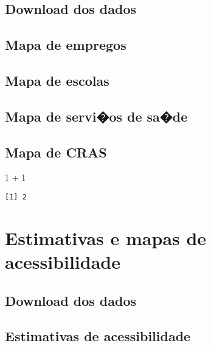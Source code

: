 \documentclass[
  letterpaper,
  DIV=11,
  numbers=noendperiod]{scrreprt}
\newenvironment{Shaded}{\begin{snugshade}}{\end{snugshade}}
\newcommand{\DecValTok}[1]{\textcolor[rgb]{0.68,0.00,0.00}{#1}}
\newcommand{\SpecialCharTok}[1]{\textcolor[rgb]{0.37,0.37,0.37}{#1}}
\begin{document}
\hypertarget{download-dos-dados-1}{%
\section{Download dos dados}\label{download-dos-dados-1}}

\hypertarget{mapa-de-empregos}{%
\section{Mapa de empregos}\label{mapa-de-empregos}}

\hypertarget{mapa-de-escolas}{%
\section{Mapa de escolas}\label{mapa-de-escolas}}

\hypertarget{mapa-de-servios-de-sade}{%
\section{Mapa de servi�os de sa�de}\label{mapa-de-servios-de-sade}}

\hypertarget{mapa-de-cras}{%
\section{Mapa de CRAS}\label{mapa-de-cras}}

\begin{Shaded}
\begin{Highlighting}[]
\DecValTok{1} \SpecialCharTok{+} \DecValTok{1}
\end{Highlighting}
\end{Shaded}

\begin{verbatim}
[1] 2
\end{verbatim}

\hypertarget{estimativas-e-mapas-de-acessibilidade}{%
\chapter{Estimativas e mapas de
acessibilidade}\label{estimativas-e-mapas-de-acessibilidade}}

\hypertarget{download-dos-dados-2}{%
\section{Download dos dados}\label{download-dos-dados-2}}

\hypertarget{estimativas-de-acessibilidade}{%
\section{Estimativas de
acessibilidade}\label{estimativas-de-acessibilidade}}
\end{document}
